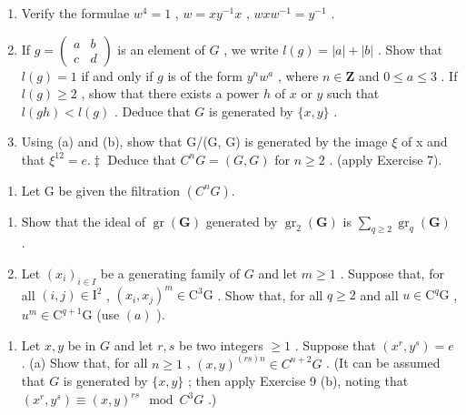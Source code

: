 \begin{enumerate}
\def\labelenumi{(\alph{enumi})}
\item
  Verify the formulae \(w^4 = 1\) , \(w = xy^{-1}x\) , \(wxw^{-1} = y^{-1}\) .
\item
  If \(g = \begin{pmatrix} a & b \\ c & d \end{pmatrix}\) is an element of \(G\) , we write \(l(g) = |a| + |b|\) . Show that \(l(g) = 1\) if and only if \(g\) is of the form \(y^n w^a\) , where \(n \in \mathbf{Z}\) and \(0 \leqslant a \leqslant 3\) . If \(l(g) \geqslant 2\) , show that there exists a power \(h\) of \(x\) or \(y\) such that \(l(gh) < l(g)\) . Deduce that \(G\) is generated by \(\{x, y\}\) .
\item
  Using (a) and (b), show that G/(G, G) is generated by the image \(\xi\) of x and that \(\xi^{12} = e.\ddagger\) Deduce that \(C^{n}G = (G, G)\) for \(n \geqslant 2\) . (apply Exercise 7).
\end{enumerate}

\begin{enumerate}
\def\labelenumi{\arabic{enumi}.}
\setcounter{enumi}{8}
\tightlist
\item
  Let G be given the filtration \((C^{n}G)\).
\end{enumerate}

\begin{enumerate}
\def\labelenumi{(\alph{enumi})}
\item
  Show that the ideal of \(\operatorname{gr}(\mathbf{G})\) generated by \(\operatorname{gr}_2(\mathbf{G})\) is \(\sum_{q\geqslant 2}\operatorname{gr}_q(\mathbf{G})\) .
\item
  Let \((x_{i})_{i\in I}\) be a generating family of \(G\) and let \(m\geqslant 1\) . Suppose that, for all \((i,j)\in \mathrm{I}^2\) , \((x_i,x_j)^m\in \mathrm{C}^3\mathrm{G}\) . Show that, for all \(q\geqslant 2\) and all \(u\in \mathrm{C}^q\mathrm{G}\) , \(u^{m}\in \mathrm{C}^{q + 1}\mathrm{G}\) (use \((a)\) ).
\end{enumerate}

\begin{enumerate}
\def\labelenumi{\arabic{enumi}.}
\setcounter{enumi}{9}
\tightlist
\item
  Let \(x, y\) be in \(G\) and let \(r, s\) be two integers \(\geqslant 1\) . Suppose that \((x^r, y^s) = e\) . (a) Show that, for all \(n \geqslant 1\) , \((x, y)^{(rs)n} \in C^{n+2}G\) . (It can be assumed that \(G\) is generated by \(\{x, y\}\) ; then apply Exercise 9 (b), noting that \((x^r, y^s) \equiv (x, y)^{rs} \mod C^3G\) .)
\end{enumerate}

